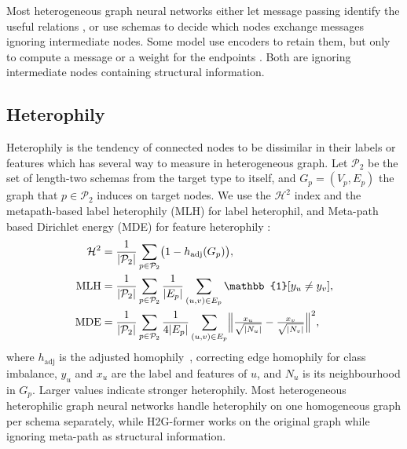 \documentclass{article}
\begin{document}
Most heterogeneous graph neural networks either let message passing identify the useful relations \cite{schlichtkrull2018rgcn,lv2021hgb,hu2020heterogeneous,zhang2019heterogeneous,mao2023hinormer}, or use schemas to decide which nodes exchange messages \cite{wang2019han,yang2023sehgnn,li2024lmsps} ignoring intermediate nodes. Some model use encoders to retain them, but only to compute a message or a weight for the endpoints \cite{fu2020magnn,fu2024mecch,kim2024mf2vec}. Both are ignoring intermediate nodes containing structural information.

\subsection{Heterophily}
Heterophily is the tendency of connected nodes to be dissimilar in their labels or features which has several way to measure in heterogeneous graph. Let $\mathcal{P}_2$ be the set of length-two schemas from the target type to itself, and $G_p=(V_p,E_p)$ the graph that $p\in\mathcal{P}_2$ induces on target nodes. We use the $\mathcal{H}^2$ index \cite{lin2025heterophily} and the metapath-based label heterophily (MLH) for label heterophil, and Meta-path based Dirichlet energy (MDE) for feature heterophily \cite{li2025hetero2net}:
\begin{align}
  \mathcal{H}^2&=\frac{1}{|\mathcal{P}_2|}\sum_{p\in\mathcal{P}_2}\bigl(1-h_{\mathrm{adj}}(G_p)\bigr),
  \label{eq:h2}\\
  \mathrm{MLH}&=\frac{1}{|\mathcal{P}_2|}\sum_{p\in\mathcal{P}_2}\frac{1}{|E_p|}\sum_{(u,v)\in E_p}\mathbb{1}[y_u\neq y_v],
  \label{eq:mlh}\\
  \mathrm{MDE}&=\frac{1}{|\mathcal{P}_2|}\sum_{p\in\mathcal{P}_2}\frac{1}{4|E_p|}\sum_{(u,v)\in E_p}\Bigl\lVert\tfrac{x_u}{\sqrt{|N_u|}}-\tfrac{x_v}{\sqrt{|N_v|}}\Bigr\rVert^2,
  \label{eq:mde}
\end{align}
where $h_{\mathrm{adj}}$ is the adjusted homophily~, correcting edge homophily for class imbalance, $y_u$ and $x_u$ are the label and features of $u$, and $N_u$ is its neighbourhood in $G_p$. Larger values indicate stronger heterophily. Most heterogeneous heterophilic graph neural networks \cite{li2025hetero2net,lu2026addressing,shen2025heterophily} handle heterophily on one homogeneous graph per schema separately, while H2G-former \cite{lin2025heterophily} works on the original graph while ignoring meta-path as structural information.
\end{document}
